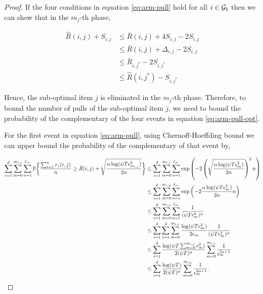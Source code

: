 \begin{proof}
If the four conditions in equation \ref{eq:arm-pull} hold for all $i\in\mathcal{G}_b$ then we can show that in the $m_{j}$-th phase,

\begin{align*}
\hat{R}(i,j) + S_{i,j} &\leq \bar{R}(i,j) + 4S_{i,j} - 2S_{i,j} \\
&\leq \bar{R}(i,j) + \Delta_{i,j} - 2S_{i,j}\\
& \leq \bar{R}_{i,j^*} - 2S_{i,j^*} \\
&\leq \hat{R}(i,j^*) - S_{i , j^*}
\end{align*}

Hence, the sub-optimal item $j$ is eliminated in the $m_{j}$-th phase. Therefore, to bound the number of pulls of the sub-optimal item $j$, we need to bound the probability of the complementary of the four events in equation \ref{eq:arm-pull-opt}.

For the first event in equation \ref{eq:arm-pull}, using Chernoff-Hoeffding bound we can upper bound the probability of the complementary of that event by,

\begin{align*}
\sum_{i=1}^{d}\sum_{m=0}^{m_{i,j}}\sum_{n=1}^{\ell_{m_{}}}\mathbb{P}\bigg\lbrace \dfrac{\sum_{s=1}^{n} r_{s}(i,j)}{n} \geq  \bar{R}(i,j) + \sqrt{\dfrac{\alpha\log(\psi T\epsilon_{m_{i,j}}^2)}{2n}} \bigg\rbrace & \leq \sum_{i=1}^{d}\sum_{m=0}^{m_{i,j}}\sum_{n=1}^{\ell_{m_{}}}\exp\left(-2 \left(\sqrt{\dfrac{\alpha\log(\psi T\epsilon_{m_{}}^2)}{2n}}\right)^2 n \right)\\
&\leq \sum_{i=1}^{d}\sum_{m=0}^{m_{i,g}}\sum_{n=1}^{\ell_{m_{}}}\exp\left(-2\dfrac{\alpha\log(\psi T\epsilon_{m_{}}^2)}{2n}n \right)\\
&\leq \sum_{i=1}^{d}\sum_{m=0}^{m_{i,j}}\sum_{n=1}^{\ell_{m_{}}}\dfrac{1}{(\psi T\epsilon_{m_{}}^2)^{\alpha}} \\
&\leq \sum_{i=1}^{d}\sum_{i=1}^{d}\sum_{m=0}^{m_{i,j}}\dfrac{\log(\psi T\epsilon_{m_{}}^2)}{2\epsilon_{m_{}}}\dfrac{1}{(\psi T\epsilon_{m_{}}^2)^{\alpha}} \\
&\leq \sum_{i=1}^{d} \dfrac{\log(\psi T  \sum_{m=0}^{m_{i,j}}\epsilon_{m}^2)}{2(\psi T)^{\alpha}}\sum_{m=0}^{m_{i,j}}\dfrac{1}{\epsilon_{m_{}}^{2\alpha +1}} \\
&\leq \sum_{i=1}^{d}\dfrac{\log(\psi T)}{2(\psi T)^{\alpha}}\sum_{m=0}^{m_{i,j}}\dfrac{1}{\epsilon_{m_{}}^{2\alpha +1}}.
\end{align*}


\end{proof}
